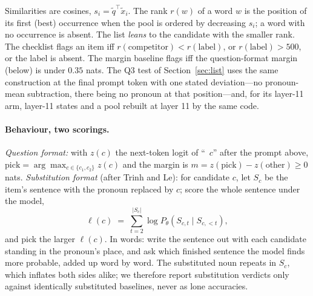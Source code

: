\documentclass[11pt]{article}
\begin{document}
Similarities are cosines, $s_i = \tilde{q}^{\top} \tilde{x}_i$. The
rank $r(w)$ of a word $w$ is the position of its first (best)
occurrence when the pool is ordered by decreasing $s_i$; a word
with no occurrence is absent. The list \emph{leans} to the
candidate with the smaller rank. The checklist flags an item iff
$r(\text{competitor}) < r(\text{label})$, or $r(\text{label}) > 500$,
or the label is absent. The margin baseline flags iff the
question-format margin (below) is under $0.35$ nats. The Q3 test of
Section~\ref{sec:list} uses the same construction at the final
prompt token with one stated deviation---no pronoun-mean
subtraction, there being no pronoun at that position---and, for its
layer-11 arm, layer-11 states and a pool rebuilt at layer 11 by the
same code.

\paragraph{Behaviour, two scorings.} \emph{Question format:} with
$z(c)$ the next-token logit of ``\ $c$'' after the prompt above,
$\text{pick} = \arg\max_{c \in \{c_1, c_2\}} z(c)$ and the margin is
$m = z(\text{pick}) - z(\text{other}) \ge 0$ nats. \emph{Substitution
format} (after Trinh and Le): for candidate $c$, let $S_c$ be the
item's sentence with the pronoun replaced by $c$; score the whole
sentence under the model,
\begin{equation}
\ell(c) \;=\; \sum_{t=2}^{|S_c|} \log P_\theta(S_{c,t} \mid S_{c,<t}),
\label{eq:subst}
\end{equation}
and pick the larger $\ell(c)$. In words: write the sentence out
with each candidate standing in the pronoun's place, and ask which
finished sentence the model finds more probable, added up word by
word. The substituted noun repeats in
$S_c$, which inflates both sides alike; we therefore report
substitution verdicts only against identically substituted
baselines, never as lone accuracies.
\end{document}
